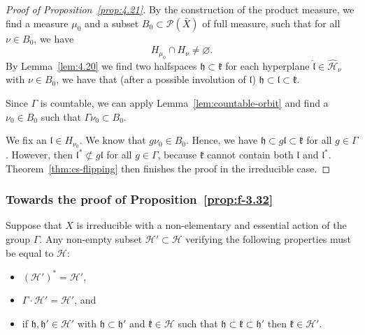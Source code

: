 \begin{proof}[Proof of Proposition~\ref{prop:4.21}]
  By the construction of the product measure, we find a measure \(\mu_0\) and a subset \(B_0 \subset \mathcal{P}(\bar X)\) of full measure, such that for all \(\nu \in B_0\), we have
  \[
    H_{\mu_0} \cap H_\nu \neq \varnothing.
  \]
  By Lemma~\ref{lem:4.20} we find two halfspaces \(\mathfrak{h} \subset \mathfrak{k}\) for each hyperplane \(\mathfrak{\hat l} \in \mathcal{\hat H}_\nu\) with \(\nu \in B_0\), we have that (after a possible involution of \(\mathfrak{l}\)) \(\mathfrak{h} \subset \mathfrak{l} \subset \mathfrak{k}\).

  Since \(\Gamma\) is countable, we can apply Lemma~\ref{lem:countable-orbit} and find a \(\nu_0 \in B_0\) such that \(\Gamma \nu_0 \subset B_0\). 

  We fix an \(\mathfrak{l} \in H_{\nu_0}\). We know that \(g\nu_0 \in B_0\). Hence, we have \(\mathfrak{h} \subset g\mathfrak{l} \subset \mathfrak{k}\) for all \(g \in \Gamma\). However, then \(\mathfrak{l}^\ast \not \subset g\mathfrak{l}\) for all \(g \in \Gamma\), because \(\mathfrak{k}\) cannot contain both \(\mathfrak{l}\) and \(\mathfrak{l}^\ast\). Theorem~\ref{thm:cs-flipping} then finishes the proof in the irreducible case.
\end{proof}

\subsubsection*{Towards the proof of Proposition~\ref{prop:f-3.32}}

\begin{lemma}
  \label{lem:f-3.31}
  Suppose that \(X\) is irreducible with a non-elementary and essential action of the group \(\Gamma\). Any non-empty subset \(\mathcal{H}' \subset  \mathcal{H}\) verifying the following properties must be equal to \(\mathcal{H}\):
  \begin{itemize}
  \item \((\mathcal{H}')^\ast = \mathcal{H}'\),
  \item \(\Gamma \cdot \mathcal{H}' = \mathcal{H}'\), and
  \item if \(\mathfrak{h}, \mathfrak{h}' \in \mathcal{H}'\) with \(\mathfrak{h} \subset \mathfrak{h}'\) and \(\mathfrak{k} \in \mathcal{H}\) such that \(\mathfrak{h} \subset \mathfrak{k} \subset \mathfrak{h}'\) then \(\mathfrak{k} \in \mathcal{H}'\).
  \end{itemize}
\end{lemma}

